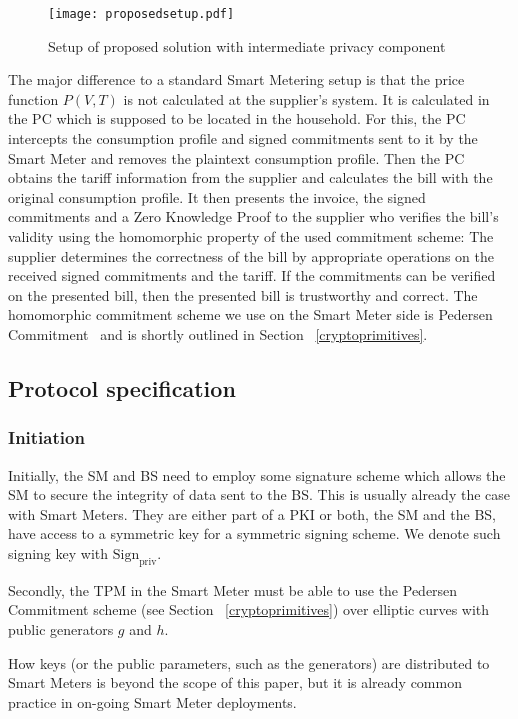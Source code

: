 \documentclass[english]{llncs}
\begin{document}
\begin{figure}
\texttt{[image: proposedsetup.pdf]}
\caption{Setup of proposed solution with intermediate privacy component}
\label{fig:proposedsolution}
\end{figure}

The major difference to a standard Smart Metering setup is that the price function $P(V,T)$ is not calculated at the supplier's system.
It is calculated in the PC which is supposed to be located in the household. 
For this, the PC intercepts the consumption profile and signed commitments sent to it by the Smart Meter 
and removes the plaintext consumption profile.
Then the PC obtains the tariff information from the supplier and calculates the bill with the original consumption profile.
It then presents the invoice, the signed commitments and a Zero Knowledge Proof to the supplier who verifies the bill's validity using the homomorphic property of the used commitment scheme:
The supplier determines the correctness of the bill by appropriate operations on the received signed commitments and the tariff.
If the commitments can be verified on the presented bill, then the presented bill is trustworthy and correct.
The homomorphic commitment scheme we use on the Smart Meter side is Pedersen Commitment~\cite{Ped} and is shortly outlined in Section ~\ref{cryptoprimitives}.

\subsection{Protocol specification}
\label{concretesolution}

\subsubsection{Initiation}
\label{initiation}
Initially, the SM and BS need to employ some signature scheme which allows the SM to secure the integrity of data sent to the BS. This is usually already the case with Smart Meters. They are either part of a PKI or both, the SM and the BS, have access to a symmetric key for a symmetric signing scheme. We denote such signing key with $\text{Sign}_\text{priv}$.

Secondly, the TPM in the Smart Meter must be able to use the Pedersen Commitment scheme (see Section ~\ref{cryptoprimitives}) over elliptic curves with public generators $g$ and $h$.

How keys (or the public parameters, such as the generators) are distributed to Smart Meters is beyond the scope of this paper, but it is already common practice in on-going Smart Meter deployments.
\end{document}

